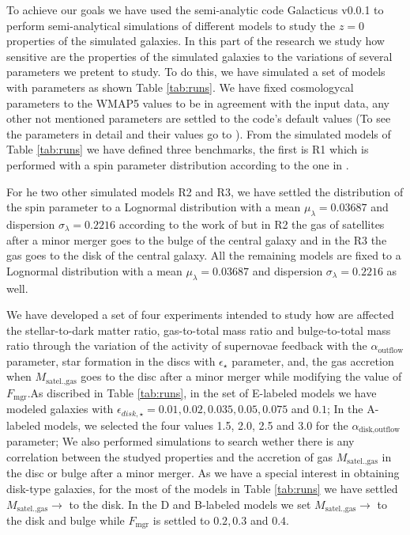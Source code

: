 \documentclass[usenatbib]{mn2e}
\begin{document}
To achieve our goals we have used the semi-analytic code Galacticus
v0.0.1 to perform semi-analytical simulations of different models to
study the $z=0$  properties of the simulated galaxies.  In this part
of the research we study  how sensitive are the properties of the
simulated  galaxies  to the variations of several parameters we
pretent to study. To do this, we have simulated a set of models with
parameters as shown Table \ref{tab:runs}. We have fixed cosmologycal
parameters to the WMAP5 values to be in agreement with the input data,
any other not mentioned parameters are settled to the code's default
values (To see the parameters in detail and their values go to
\cite{2010arXiv1008.1786B}). From the  simulated models of Table
\ref{tab:runs} we have defined three benchmarks,  the first is R1
which is performed with a spin parameter distribution according to the
one in \cite{2007MNRAS.376..215B}. 

For he two other simulated models R2 and R3,  we have settled the
distribution of the spin parameter to a Lognormal distribution  with a
mean  $\mu_{\lambda}=0.03687$ and dispersion $\sigma_{\lambda}=0.2216$
according to the work of \cite{2011MNRAS.411..584M} but in  R2 the gas
of satellites after a minor merger goes to the bulge of the central
galaxy and in the R3 the gas goes to the disk of the central
galaxy. All the remaining models are fixed to a Lognormal distribution
with a mean $\mu_{\lambda}=0.03687$ and dispersion
$\sigma_{\lambda}=0.2216$ as well. 
 
We have developed a set of four experiments intended to study how are
affected the stellar-to-dark matter ratio, gas-to-total mass ratio and
bulge-to-total mass ratio through the variation of the activity of
supernovae feedback with the  $\alpha_{\text{outflow}}$ parameter,
star formation in the discs with  $\epsilon_\star$ parameter, and, the
gas accretion  when $M_{\text{satel.,gas}}$ goes to the disc after a
minor merger while modifying the value of  $F_{\text{mgr}}$.As
discribed in Table \ref{tab:runs}, in the set of E-labeled models  we
have modeled galaxies  with $\epsilon_{disk,\star}=0.01, 0.02, 0.035,
0.05,0.075$ and $0.1$; In the A-labeled models, we selected the four
values 1.5, 2.0, 2.5 and 3.0 for the $\alpha_{\text{disk,outflow}}$
parameter; We also performed simulations to search wether there is any
correlation between the studyed properties and the accretion of gas
$M_{\text{satel.,gas}}$ in the disc or bulge after a minor merger. As
we have a special interest in obtaining disk-type galaxies, for the
most of the models in Table \ref{tab:runs} we have settled
$M_{\text{satel.,gas}}\to$ to the disk. In the D and B-labeled models
we set $M_{\text{satel.,gas}}\to$ to the disk and bulge while
$F_{\text{mgr}}$ is settled to $0.2,0.3$ and $0.4$. 
  
\end{document}
